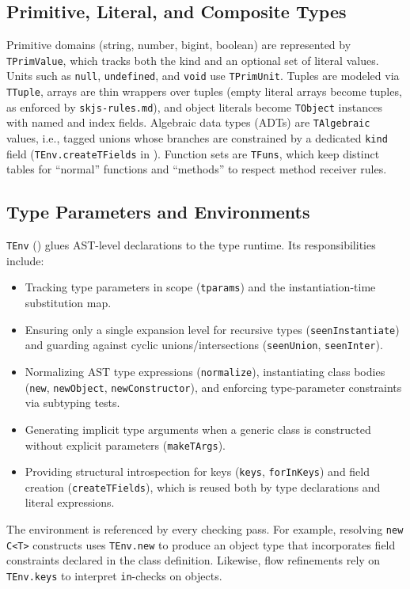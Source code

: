 \documentclass[11pt]{article}
\newcommand{\code}[1]{\path{#1}}
\begin{document}
\subsection{Primitive, Literal, and Composite Types}
Primitive domains (string, number, bigint, boolean) are represented by \texttt{TPrimValue}, which tracks both the kind and an optional set of literal values. Units such as \texttt{null}, \texttt{undefined}, and \texttt{void} use \texttt{TPrimUnit}. Tuples are modeled via \texttt{TTuple}, arrays are thin wrappers over tuples (empty literal arrays become tuples, as enforced by \texttt{skjs-rules.md}), and object literals become \texttt{TObject} instances with named and index fields. Algebraic data types (ADTs) are \texttt{TAlgebraic} values, i.e., tagged unions whose branches are constrained by a dedicated \texttt{kind} field (\texttt{TEnv.createTFields} in \code{src/TEnv.sk}). Function sets are \texttt{TFuns}, which keep distinct tables for ``normal'' functions and ``methods'' to respect method receiver rules.

\subsection{Type Parameters and Environments}
\texttt{TEnv} (\code{src/TEnv.sk}) glues AST-level declarations to the type runtime. Its responsibilities include:
\begin{itemize}[leftmargin=*]
  \item Tracking type parameters in scope (\texttt{tparams}) and the instantiation-time substitution map.
  \item Ensuring only a single expansion level for recursive types (\texttt{seenInstantiate}) and guarding against cyclic unions/intersections (\texttt{seenUnion}, \texttt{seenInter}).
  \item Normalizing AST type expressions (\texttt{normalize}), instantiating class bodies (\texttt{new}, \texttt{newObject}, \texttt{newConstructor}), and enforcing type-parameter constraints via subtyping tests.
  \item Generating implicit type arguments when a generic class is constructed without explicit parameters (\texttt{makeTArgs}).
  \item Providing structural introspection for keys (\texttt{keys}, \texttt{forInKeys}) and field creation (\texttt{createTFields}), which is reused both by type declarations and literal expressions.
\end{itemize}
The environment is referenced by every checking pass. For example, resolving \texttt{new C<T>} constructs uses \texttt{TEnv.new} to produce an object type that incorporates field constraints declared in the class definition. Likewise, flow refinements rely on \texttt{TEnv.keys} to interpret \texttt{in}-checks on objects.
\end{document}
